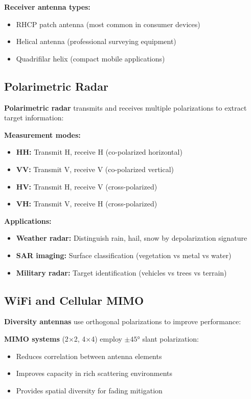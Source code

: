 \textbf{Receiver antenna types:}
\begin{itemize}
\item RHCP patch antenna (most common in consumer devices)
\item Helical antenna (professional surveying equipment)
\item Quadrifilar helix (compact mobile applications)
\end{itemize}

\subsection{Polarimetric Radar}

\textbf{Polarimetric radar} transmits and receives multiple polarizations to extract target information:

\textbf{Measurement modes:}
\begin{itemize}
\item \textbf{HH:} Transmit H, receive H (co-polarized horizontal)
\item \textbf{VV:} Transmit V, receive V (co-polarized vertical)
\item \textbf{HV:} Transmit H, receive V (cross-polarized)
\item \textbf{VH:} Transmit V, receive H (cross-polarized)
\end{itemize}

\textbf{Applications:}
\begin{itemize}
\item \textbf{Weather radar:} Distinguish rain, hail, snow by depolarization signature
\item \textbf{SAR imaging:} Surface classification (vegetation vs metal vs water)
\item \textbf{Military radar:} Target identification (vehicles vs trees vs terrain)
\end{itemize}

\subsection{WiFi and Cellular MIMO}

\textbf{Diversity antennas} use orthogonal polarizations to improve performance:

\textbf{MIMO systems} (2$\times$2, 4$\times$4) employ $\pm 45°$ slant polarization:
\begin{itemize}
\item Reduces correlation between antenna elements
\item Improves capacity in rich scattering environments
\item Provides spatial diversity for fading mitigation
\end{itemize}

